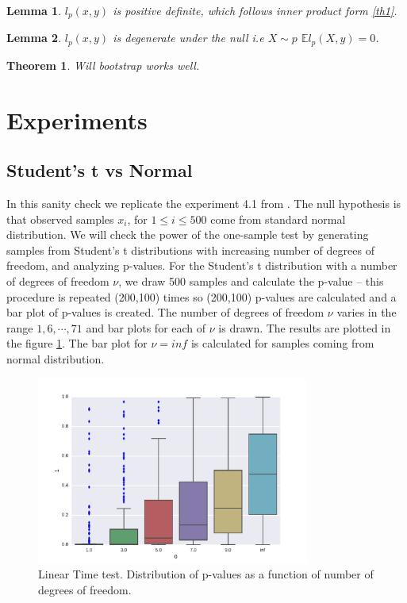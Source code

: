 \documentclass{article}
\newtheorem{lemma}{Lemma}
\newtheorem{Theorem}{Theorem}
\newcommand{\ev}{\mathbb{E}}
\begin{document}
\begin{lemma}
 $l_p(x,y)$ is positive definite, which follows inner product form \ref{th1}.
\end{lemma}

\begin{lemma}
 $l_p(x,y)$ is degenerate under the null i.e  $X \sim p $ $\ev l_p(X,y)=0$. 
\end{lemma}



\begin{Theorem}
 Will bootstrap  works well. 
\end{Theorem}


\section{Experiments}

\subsection{Student's t vs Normal}
In this  sanity check we replicate the experiment 4.1 from \cite{gorham2015measuring}. The null hypothesis is that observed samples $x_i$, for $1 \leq i \leq 500$ come from standard normal distribution. We will check the power of the one-sample test by generating samples from Student's t distributions with increasing number of degrees of freedom, and analyzing p-values. For the Student's t distribution with a number of degrees of freedom $\nu$, we draw 500 samples and calculate the p-value -- this procedure is repeated (200,100) times so (200,100) p-values are calculated and a bar plot of p-values is created. The number of degrees of freedom $\nu$ varies in the range $1,6,\cdots,71$ and bar plots for each of $\nu$ is drawn.  The results are plotted in the figure \ref{fig:studentst}. The bar plot for $\nu = inf$ is calculated for samples coming from normal distribution.

\begin{figure}
\label{fig:studentst}
\includegraphics[width=0.8\textwidth]{./img/student.pdf}
\caption{Linear Time test. Distribution of p-values as a function of number of degrees of freedom.}
\end{figure}
\end{document}
